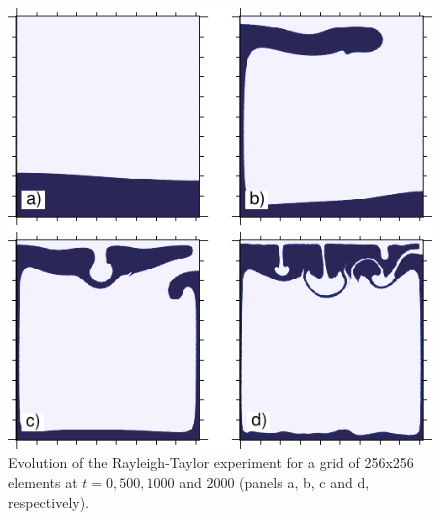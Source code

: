 \documentclass[draft,tec]{agutexSI2019}
\begin{document}
\begin{figure}
\noindent\includegraphics[width=\textwidth]{./Figures/Rayleigh.pdf}
\caption{Evolution of the Rayleigh-Taylor experiment for a grid of 256x256 elements at $t=0, 500, 1000$ and $2000$ (panels a, b, c and d, respectively).}
\label{fig:rayleigh}
\end{figure}
\end{document}

